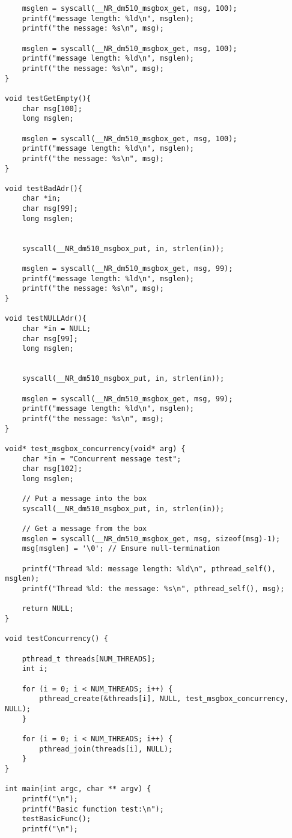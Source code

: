 \documentclass[12pt,a4paper]{report}
\begin{document}
\begin{verbatim}
    msglen = syscall(__NR_dm510_msgbox_get, msg, 100);
    printf("message length: %ld\n", msglen);
    printf("the message: %s\n", msg);

    msglen = syscall(__NR_dm510_msgbox_get, msg, 100);
    printf("message length: %ld\n", msglen);
    printf("the message: %s\n", msg);
}

void testGetEmpty(){
    char msg[100];
    long msglen;

    msglen = syscall(__NR_dm510_msgbox_get, msg, 100);
    printf("message length: %ld\n", msglen);
    printf("the message: %s\n", msg);
}

void testBadAdr(){
    char *in;
    char msg[99];
    long msglen;


    syscall(__NR_dm510_msgbox_put, in, strlen(in));

    msglen = syscall(__NR_dm510_msgbox_get, msg, 99);
    printf("message length: %ld\n", msglen);
    printf("the message: %s\n", msg);
}

void testNULLAdr(){
    char *in = NULL;
    char msg[99];
    long msglen;


    syscall(__NR_dm510_msgbox_put, in, strlen(in));

    msglen = syscall(__NR_dm510_msgbox_get, msg, 99);
    printf("message length: %ld\n", msglen);
    printf("the message: %s\n", msg);
}

void* test_msgbox_concurrency(void* arg) {
    char *in = "Concurrent message test";
    char msg[102];
    long msglen;

    // Put a message into the box
    syscall(__NR_dm510_msgbox_put, in, strlen(in));

    // Get a message from the box
    msglen = syscall(__NR_dm510_msgbox_get, msg, sizeof(msg)-1);
    msg[msglen] = '\0'; // Ensure null-termination

    printf("Thread %ld: message length: %ld\n", pthread_self(), msglen);
    printf("Thread %ld: the message: %s\n", pthread_self(), msg);

    return NULL;
}

void testConcurrency() {

    pthread_t threads[NUM_THREADS];
    int i;

    for (i = 0; i < NUM_THREADS; i++) {
        pthread_create(&threads[i], NULL, test_msgbox_concurrency, NULL);
    }

    for (i = 0; i < NUM_THREADS; i++) {
        pthread_join(threads[i], NULL);
    }
}

int main(int argc, char ** argv) {
    printf("\n");
    printf("Basic function test:\n");
    testBasicFunc();
    printf("\n");


\end{verbatim}
\end{document}
